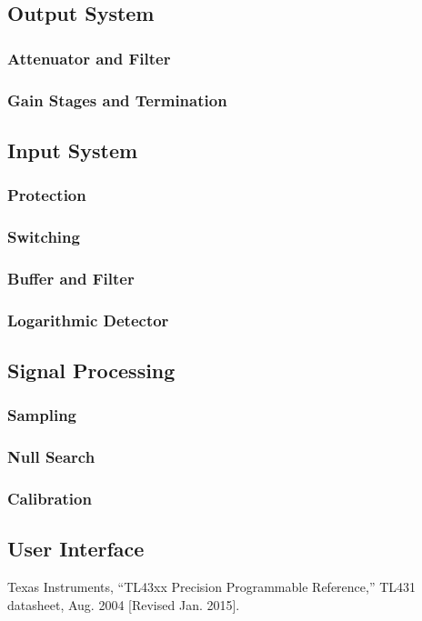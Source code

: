 \documentclass{article}
\begin{document}
\subsection{Output System}

\subsubsection{Attenuator and Filter}
\subsubsection{Gain Stages and Termination}

\subsection{Input System}

\subsubsection{Protection}
\subsubsection{Switching}
\subsubsection{Buffer and Filter}
\subsubsection{Logarithmic Detector}

\subsection{Signal Processing}
\subsubsection{Sampling}
\subsubsection{Null Search}
\subsubsection{Calibration}

\subsection{User Interface}

\newpage
\begin{thebibliography}{9}
Texas Instruments, ``TL43xx Precision Programmable Reference,''
TL431 datasheet, Aug. 2004 [Revised Jan. 2015].
\end{thebibliography}
\end{document}
